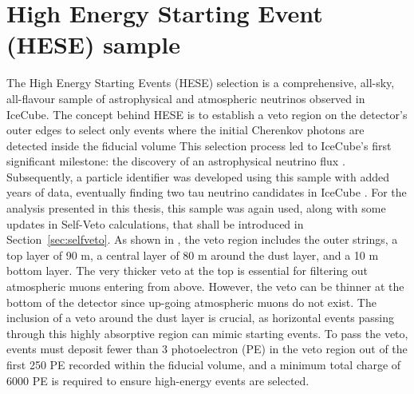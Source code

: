 \section{High Energy Starting Event (HESE) sample} 
\label{sec:HESE}
The High Energy Starting Events (HESE) selection is a comprehensive, all-sky, all-flavour sample of astrophysical and atmospheric neutrinos observed in IceCube. The concept behind HESE is to establish a veto region on the detector's outer edges to select only events where the initial Cherenkov photons are detected inside the fiducial volume This selection process led to IceCube's first significant milestone: the discovery of an astrophysical neutrino flux . Subsequently, a particle identifier was developed using this sample with added years of data, eventually finding two tau neutrino candidates in IceCube . For the analysis presented in this thesis, this sample was again used, along with some updates in Self-Veto calculations, that shall be introduced in Section~\ref{sec:selfveto}. As shown in , the veto region includes the outer strings, a top layer of 90 m, a central layer of 80 m around the dust layer, and a 10 m bottom layer. The very thicker veto at the top is essential for filtering out atmospheric muons entering from above. However, the veto can be thinner at the bottom of the detector since up-going atmospheric muons do not exist. The inclusion of a veto around the dust layer is crucial, as horizontal events passing through this highly absorptive region can mimic starting events. To pass the veto, events must deposit fewer than 3 photoelectron (PE) in the veto region out of the first 250 PE recorded within the fiducial volume, and a minimum total charge of 6000 PE is required to ensure high-energy events are selected.

